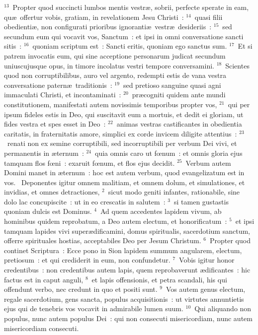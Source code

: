 ${}^{13}$~Propter quod succincti lumbos mentis vestr\ae , sobrii, perfecte sperate in eam, qu\ae\ offertur vobis, gratiam, in revelationem Jesu Christi~:
${}^{14}$~quasi filii obedienti\ae , non configurati prioribus ignoranti\ae\ vestr\ae\ desideriis~:
${}^{15}$~sed secundum eum qui vocavit vos, Sanctum~: et ipsi in omni conversatione sancti sitis~:
${}^{16}$~quoniam scriptum est~: Sancti eritis, quoniam ego sanctus sum.
${}^{17}$~Et si patrem invocatis eum, qui sine acceptione personarum judicat secundum uniuscujusque opus, in timore incolatus vestri tempore conversamini.
${}^{18}$~Scientes quod non corruptibilibus, auro vel argento, redempti estis de vana vestra conversatione patern\ae\ traditionis~:
${}^{19}$~sed pretioso sanguine quasi agni immaculati Christi, et incontaminati~:
${}^{20}$~pr\ae cogniti quidem ante mundi constitutionem, manifestati autem novissimis temporibus propter vos,
${}^{21}$~qui per ipsum fideles estis in Deo, qui suscitavit eum a mortuis, et dedit ei gloriam, ut fides vestra et spes esset in Deo~:
${}^{22}$~animas vestras castificantes in obedientia caritatis, in fraternitatis amore, simplici ex corde invicem diligite attentius~:
${}^{23}$~renati non ex semine corruptibili, sed incorruptibili per verbum Dei vivi, et permanentis in \ae ternum~:
${}^{24}$~quia omnis caro ut fœnum~: et omnis gloria ejus tamquam flos fœni~: exaruit fœnum, et flos ejus decidit.
${}^{25}$~Verbum autem Domini manet in \ae ternum~: hoc est autem verbum, quod evangelizatum est in vos.
~Deponentes igitur omnem malitiam, et omnem dolum, et simulationes, et invidias, et omnes detractiones,
${}^{2}$~sicut modo geniti infantes, rationabile, sine dolo lac concupiscite~: ut in eo crescatis in salutem~:
${}^{3}$~si tamen gustastis quoniam dulcis est Dominus.
${}^{4}$~Ad quem accedentes lapidem vivum, ab hominibus quidem reprobatum, a Deo autem electum, et honorificatum~:
${}^{5}$~et ipsi tamquam lapides vivi super\ae dificamini, domus spiritualis, sacerdotium sanctum, offerre spirituales hostias, acceptabiles Deo per Jesum Christum.
${}^{6}$~Propter quod continet Scriptura~: Ecce pono in Sion lapidem summum angularem, electum, pretiosum~: et qui crediderit in eum, non confundetur.
${}^{7}$~Vobis igitur honor credentibus~: non credentibus autem lapis, quem reprobaverunt \ae dificantes~: hic factus est in caput anguli,
${}^{8}$~et lapis offensionis, et petra scandali, his qui offendunt verbo, nec credunt in quo et positi sunt.
${}^{9}$~Vos autem genus electum, regale sacerdotium, gens sancta, populus acquisitionis~: ut virtutes annuntietis ejus qui de tenebris vos vocavit in admirabile lumen suum.
${}^{10}$~Qui aliquando non populus, nunc autem populus Dei~: qui non consecuti misericordiam, nunc autem misericordiam consecuti.


